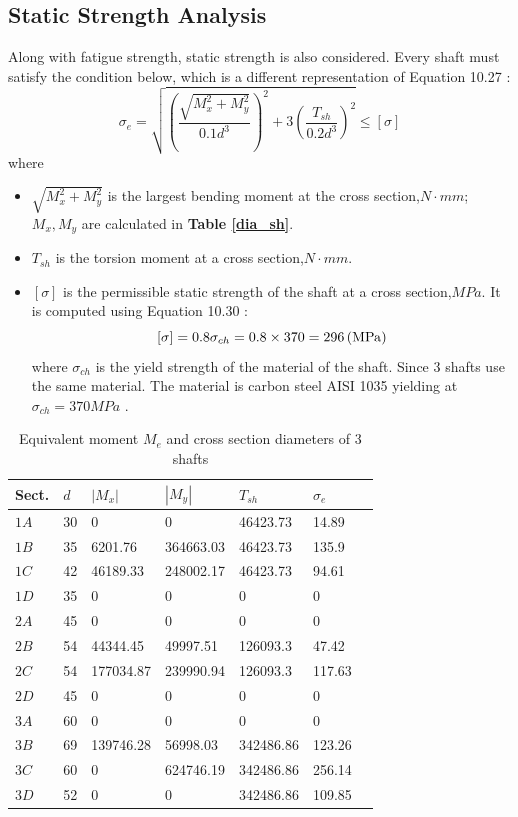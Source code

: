 \subsection{Static Strength Analysis}
Along with fatigue strength, static strength is also considered. Every shaft must satisfy the condition below, which is a different representation of Equation 10.27 \cite{tk1}:
\[\sigma_e = \sqrt{\left( \dfrac{\sqrt{M_x^2+M_y^2}}{0.1d^3}\right)^2 + 3\left( \dfrac{T_{sh}}{0.2d^3}\right) ^2} \leq [\sigma]\]
where
\begin{itemize}
	\item $ \sqrt{M_x^2+M_y^2} $ is the largest bending moment at the cross section,$ \unit{N\cdot mm} $; $ M_x, M_y $ are calculated in \textbf{Table \ref{dia_sh}}.
	\item $ T_{sh} $ is the torsion moment at a cross section,$ \unit{N\cdot mm} $.
	\item $ [\sigma] $ is the permissible static strength of the shaft at a cross section,$ \unit{MPa} $. It is computed using Equation 10.30 \cite{tk1}:
	\[[\sigma] = 0.8\sigma_{ch} = 0.8\times 370 = 296 \, (\mathrm{MPa}) \]
	where $ \sigma_{ch} $ is the yield strength of the material of the shaft. Since 3 shafts use the same material. The material is carbon steel AISI 1035 yielding at $ \sigma_{ch} = 370\unit{MPa} $ \cite{aisi1035}.
\end{itemize}

\begin{table}[ht]
	\centering
	\caption{Equivalent moment $ M_e $ and cross section diameters of 3 shafts}
	\begin{tabular}{lllllll}\toprule
		Sect. & $ d $ & $ |M_x| $ & $ |M_y| $ & $ T_{sh} $ & $ \sigma_e $ \\ \midrule
		$ 1A $	& 30 &	0			&	0			&	46423.73	& 14.89\\
		$ 1B $	& 35 &	6201.76		&	364663.03	&	46423.73	& 135.9\\
		$ 1C $	& 42 &	46189.33	&	248002.17	&	46423.73	& 94.61\\
		$ 1D $	& 35 &	0			&	0			&	0			& 0    \\
		$ 2A $	& 45 &	0			&	0			&	0			& 0	   \\
		$ 2B $	& 54 &	44344.45	&	49997.51	&	126093.3	& 47.42 \\
		$ 2C $	& 54 &	177034.87	&	239990.94	&	126093.3	& 117.63\\
		$ 2D $	& 45 &	0			&	0			&	0			& 0	   \\
		$ 3A $	& 60 &	0			&	0			&	0			& 0	   \\
		$ 3B $	& 69 &	139746.28	&	56998.03	&	342486.86	& 123.26 \\
		$ 3C $	& 60 &	0			&	624746.19	&	342486.86	& 256.14\\
		$ 3D $	& 52 &	0			&	0			&	342486.86	& 109.85\\
		\bottomrule
	\end{tabular}
	\label{static stress}
\end{table}

%

